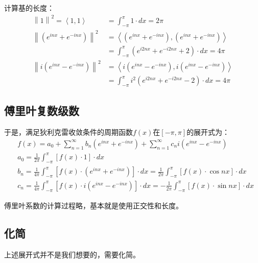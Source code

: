 计算基的长度：
\begin{align*}
\left\| 1 \right\| ^2=\left< 1,1 \right> &=\int_{-\pi}^{\pi}{1\cdot dx}=2\pi \\
\left\| \left( e^{inx}+e^{-inx} \right) \right\| ^2&=\left< \left( e^{inx}+e^{-inx} \right) ,\left( e^{inx}+e^{-inx} \right) \right> \\
&=\int_{-\pi}^{\pi}{\left( e^{i2nx}+e^{-i2nx}+2 \right) \cdot dx}=4\pi \\
\left\| i\left( e^{inx}-e^{-inx} \right) \right\| ^2&=\left< i\left( e^{inx}-e^{-inx} \right) ,i\left( e^{inx}-e^{-inx} \right) \right> \\
&=\int_{-\pi}^{\pi}{i^2\left( e^{i2nx}+e^{-i2nx}-2 \right) \cdot dx}=4\pi
\end{align*}

\subsection{傅里叶复数级数}

于是，满足狄利克雷收敛条件的周期函数$f\left( x \right) $在$\left[ -\pi ,\pi \right] $的展开式为：
\begin{align*}
&f\left( x \right) =a_0+\sum_{n=1}^{\infty}{b_n\left( e^{inx}+e^{-inx} \right)}+\sum_{n=1}^{\infty}{c_ni\left( e^{inx}-e^{-inx} \right)} \\
&a_0=\frac{1}{2\pi}\int_{-\pi}^{\pi}{\left[ f\left( x \right) \cdot 1 \right] \cdot dx} \\
&b_n=\frac{1}{4\pi}\int_{-\pi}^{\pi}{\left[ f\left( x \right) \cdot \left( e^{inx}+e^{-inx} \right) \right] \cdot dx}=\frac{1}{2\pi}\int_{-\pi}^{\pi}{\left[ f\left( x \right) \cdot \cos nx \right] \cdot dx} \\
&c_n=\frac{1}{4\pi}\int_{-\pi}^{\pi}{\left[ f\left( x \right) \cdot i\left( e^{inx}-e^{-inx} \right) \right] \cdot dx}=-\frac{1}{2\pi}\int_{-\pi}^{\pi}{\left[ f\left( x \right) \cdot \sin nx \right] \cdot dx}
\end{align*}

傅里叶系数的计算过程略，基本就是使用正交性和长度。

\subsection{化简}

上述展开式并不是我们想要的，需要化简。

